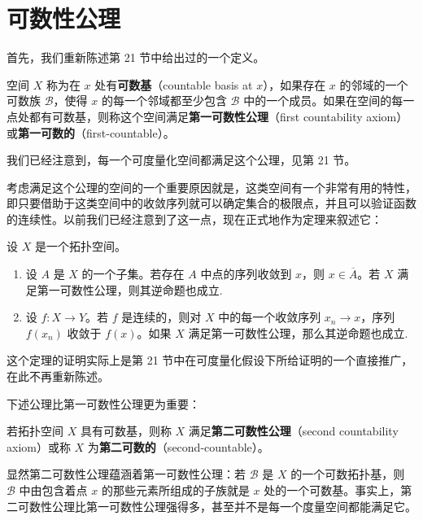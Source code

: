 \section{可数性公理}\label{section:ch04-countability-axioms}

首先，我们重新陈述第 21 节中给出过的一个定义。

\begin{definition}\label{definition:ch04-first-countable}
空间 $X$ 称为在 $x$ 处有\textbf{可数基}（countable basis at $x$），如果存在 $x$ 的邻域的一个可数族 $\mathcal{B}$，使得 $x$ 的每一个邻域都至少包含 $\mathcal{B}$ 中的一个成员。如果在空间的每一点处都有可数基，则称这个空间满足\textbf{第一可数性公理}（first countability axiom）或\textbf{第一可数的}（first-countable）。
\end{definition}

我们已经注意到，每一个可度量化空间都满足这个公理，见第 21 节。

考虑满足这个公理的空间的一个重要原因就是，这类空间有一个非常有用的特性，即只要借助于这类空间中的收敛序列就可以确定集合的极限点，并且可以验证函数的连续性。以前我们已经注意到了这一点，现在正式地作为定理来叙述它：

\begin{theorem}\label{theorem:ch04-sequence-characterization}
设 $X$ 是一个拓扑空间。
\begin{enumerate}
\item 设 $A$ 是 $X$ 的一个子集。若存在 $A$ 中点的序列收敛到 $x$，则 $x\in\overline{A}$。若 $X$ 满足第一可数性公理，则其逆命题也成立.
\item 设 $f\colon X\to Y$。若 $f$ 是连续的，则对 $X$ 中的每一个收敛序列 $x_{n}\to x$，序列 $f(x_{n})$ 收敛于 $f(x)$。如果 $X$ 满足第一可数性公理，那么其逆命题也成立.
\end{enumerate}
\end{theorem}

这个定理的证明实际上是第 21 节中在可度量化假设下所给证明的一个直接推广，在此不再重新陈述。

下述公理比第一可数性公理更为重要：

\begin{definition}\label{definition:ch04-second-countable}
若拓扑空间 $X$ 具有可数基，则称 $X$ 满足\textbf{第二可数性公理}（second countability axiom）或称 $X$ 为\textbf{第二可数的}（second-countable）。
\end{definition}

显然第二可数性公理蕴涵着第一可数性公理：若 $\mathcal{B}$ 是 $X$ 的一个可数拓扑基，则 $\mathcal{B}$ 中由包含着点 $x$ 的那些元素所组成的子族就是 $x$ 处的一个可数基。事实上，第二可数性公理比第一可数性公理强得多，甚至并不是每一个度量空间都能满足它。

